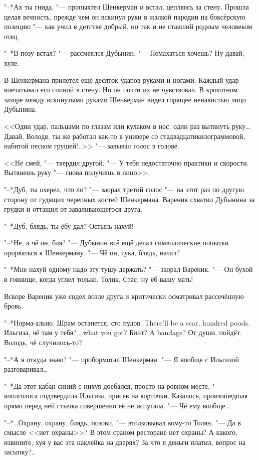 "--*Ах ты гнида, "--- пропыхтел Шенкерман и встал, цепляясь за стену.
Прошла целая вечность, прежде чем он вскинул руки в жалкой пародии на боксёрскую позицию "--- как учил в детстве добрый, но так и не ставший родным человеком отец.

"--*В позу встал? "--- рассмеялся Дубынин.
"--- Помахаться хочешь?
Ну давай, хуле.

В Шенкермана прилетел ещё десяток ударов руками и ногами.
Каждый удар впечатывал его спиной в стену.
Но он почти их не чувствовал.
В крохотном зазоре между вскинутыми руками Шенкерман видел горящее ненавистью лицо Дубынина.

<<Один удар, пальцами по глазам или кулаком в нос, один раз вытянуть руку\ldots{}
Давай, Володя, ты же работал как-то в универе со стадвадцатикилограммовой, набитой песком грушей!..>> "--- завывал голос в голове.

<<Не смей, "--- твердил другой.
"--- У тебя недостаточно практики и скорости.
Вытянешь руку "--- снова получишь в лицо>>.

"--*Дуб, ты охерел, что ли? "--- заорал третий голос "--- на этот раз по другую сторону от гудящих черепных костей Шенкермана.
Вареник схватил Дубынина за грудки и оттащил от заваливающегося друга.

"--*Дуб, блядь, ты ёбу дал?
Остынь нахуй!

"--*Не, а чё он, бля? "--- Дубынин всё ещё делал символические попытки прорваться к Шенкерману.
"--- Чё он, сука, блядь, начал?

"--*Мне нахуй одному надо эту тушу держать? "--- заорал Вареник.
"--- Он бухой в говнище, когда успел только.
Толик, Стас, ну ёб вашу мать!

Вскоре Вареник уже сидел возле друга и критически осматривал рассечённую бровь.

"--*Норма-ально.
{Шрам останется, сто пудов.}
{There'll be a scar, hundred poods.}
{Ильгиза, чё там у тебя?}
{\Ilgiza, what you got?}
{Бинт?}
{A bandage?}
От души, пойдёт.
Володь, чё случилось-то?

"--*А я откуда знаю? "--- пробормотал Шенкерман.
"--- Я вообще с Ильгизой разговаривал\ldots{}

"--*Да этот кабан синий с нихуя доебался, просто на ровном месте, "--- вполголоса подтвердила Ильгиза, присев на корточки.
Казалось, произошедшая прямо перед ней стычка совершенно её не испугала.
"--- Чё ему вообще\ldots{}

"--*\ldots{}Охрану, охрану, блядь, позови, "--- втолковывал кому-то Толян.
"--- Да в смысле <<нет охраны>>?
В этом сраном ресторане нет охраны?
А какого, извините, хуя у вас эта наклейка на дверях?
За что я деньги платил, вопрос на засыпку?..

